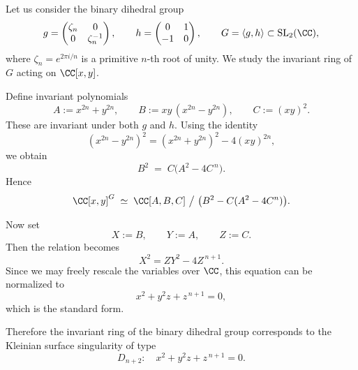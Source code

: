 \documentclass[leqno]{ltjsarticle}
\begin{document}
Let us consider the binary dihedral group
\[
g=\begin{pmatrix}\zeta_n & 0 \\ 0 & \zeta_n^{-1}\end{pmatrix},\qquad
h=\begin{pmatrix}0 & 1 \\ -1 & 0\end{pmatrix},\qquad
G=\langle g,h\rangle \subset \mathrm{SL}_2(\CC),
\]
where \(\zeta_n = e^{2\pi i/n}\) is a primitive \(n\)-th root of unity.
We study the invariant ring of \(G\) acting on \(\CC[x,y]\).

\medskip

Define invariant polynomials
\[
A := x^{2n}+y^{2n},\qquad
B := xy\,(x^{2n}-y^{2n}),\qquad
C := (xy)^2.
\]
These are invariant under both \(g\) and \(h\).  
Using the identity
\[
(x^{2n}-y^{2n})^2=(x^{2n}+y^{2n})^2-4(xy)^{2n},
\]
we obtain
\[
B^2 \;=\; C\big(A^2-4C^{\,n}\big).
\]
Hence
\[
\CC[x,y]^G \;\simeq\; \CC[A,B,C]\ \big/\ \big(B^2 - C(A^2 - 4C^n)\big).
\]

\medskip

Now set
\[
X:=B,\qquad Y:=A,\qquad Z:=C.
\]
Then the relation becomes
\[
X^2 = ZY^2 - 4Z^{\,n+1}.
\]
Since we may freely rescale the variables over \(\CC\), this equation can be normalized to
\[
x^2 + y^2 z + z^{\,n+1} = 0,
\]
which is the standard form.

\medskip

Therefore the invariant ring of the binary dihedral group corresponds to the Kleinian surface singularity of type
\[
D_{n+2}: \quad x^2 + y^2 z + z^{\,n+1} = 0.
\]
\end{document}
